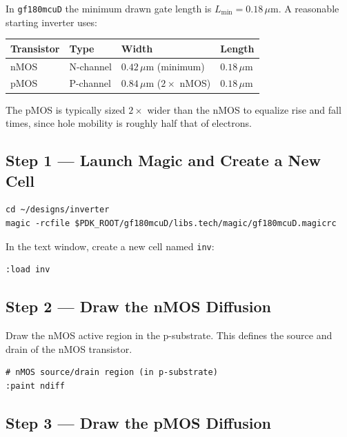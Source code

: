 \documentclass[11pt]{article}
\begin{document}
In \texttt{gf180mcuD} the minimum drawn gate length is
$L_{\min} = 0.18\,\mu\text{m}$.
A reasonable starting inverter uses:

\begin{center}
\begin{tabular}{@{}llll@{}}
\toprule
\textbf{Transistor} & \textbf{Type} & \textbf{Width} & \textbf{Length} \\
\midrule
nMOS & N-channel & $0.42\,\mu\text{m}$ (minimum) & $0.18\,\mu\text{m}$ \\
pMOS & P-channel & $0.84\,\mu\text{m}$ ($2\times$ nMOS) & $0.18\,\mu\text{m}$ \\
\bottomrule
\end{tabular}
\end{center}

The pMOS is typically sized $2\times$ wider than the nMOS to equalize
rise and fall times, since hole mobility is roughly half that of
electrons.

\subsection{Step 1 --- Launch Magic and Create a New Cell}

\begin{lstlisting}
cd ~/designs/inverter
magic -rcfile $PDK_ROOT/gf180mcuD/libs.tech/magic/gf180mcuD.magicrc
\end{lstlisting}

In the text window, create a new cell named \texttt{inv}:

\begin{lstlisting}
:load inv
\end{lstlisting}

\subsection{Step 2 --- Draw the nMOS Diffusion}

Draw the nMOS active region in the p-substrate.
This defines the source and drain of the nMOS transistor.

\begin{lstlisting}
# nMOS source/drain region (in p-substrate)
:paint ndiff
\end{lstlisting}

\subsection{Step 3 --- Draw the pMOS Diffusion}
\end{document}
